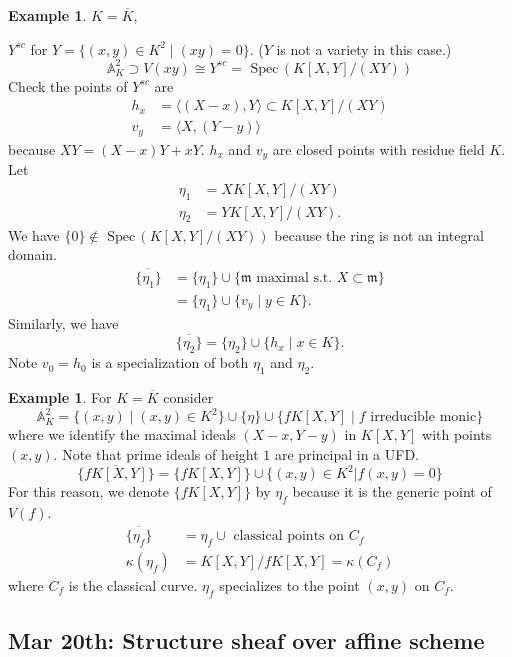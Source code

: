 \documentclass[11pt]{article}
\theoremstyle{definition}
\newtheorem{ex}[thm]{Example}
\newcommand{\spec}{\text{ Spec}\,}
\newcommand{\affn}{\mathbb A}
\newcommand{\scm}{{\mathfrak m}}
\newcommand{\lgl}{\langle}
\newcommand{\rgl}{\rangle}
\begin{document}
\begin{ex}
$K=\overline{K}$, 

$Y^{sc}$ for $Y=\{(x,y)\in K^2 \mid (xy)=0\}$. ($Y$ is not a variety in this case.)
$$
\affn^2_K\supset V(xy)\cong Y^{sc}=\spec(K[X,Y]/(XY))
$$
Check the points of $Y^{sc}$ are
\begin{align*}
h_x & = \lgl (X-x), Y\rgl\subset K[X,Y]/(XY) \\
v_y & =\lgl X, (Y-y)\rgl
\end{align*}
because $XY=(X-x)Y+xY$.
$h_x$ and $v_y$ are closed points with residue field $K$.  Let
\begin{align*}
\eta_1 & =X K[X,Y]/(XY) \\
\eta_2 & =YK[X,Y]/(XY).
\end{align*}
We have $\{0\}\notin \spec (K[X,Y]/(XY))$ because the ring is not an integral domain.
$$
\begin{aligned}
\overline{\{\eta_1\}}&=\{\eta_1\}\cup \{\scm \text{ maximal s.t. } X\subset \scm\}\\
&=\{\eta_1\}\cup \{v_y \mid y\in K\}.
\end{aligned}
$$
Similarly, we have
$$
\overline{\{\eta_2\}}=\{\eta_2\}\cup\{h_x \mid x\in K\}.
$$
Note $v_0=h_0$ is a specialization of both $\eta_1$ and $\eta_2$.
\end{ex}

\begin{ex}
For  $K=\overline{K}$ consider
 $$\affn^2_K=\{(x, y) \mid (x,y)\in K^2\} \cup \{\eta\}\cup \{fK[X,Y] \mid f \text{ irreducible monic}\}$$ 
 where we identify the maximal ideals $(X-x, Y-y)$ in $K[X,Y]$ with points $(x,y)$. 
Note that prime ideals of height $1$ are principal in a UFD.
$$
\overline{\{fK[X,Y]\}}=\{f K[X,Y]\}\cup \{(x,y)\in K^2|f(x,y)=0\}
$$
For this reason, we denote $\{fK[X,Y]\}$ by $\eta_f$ because it is the generic point of $V(f)$.
\begin{align*}
\overline{\{\eta_f\}} & =\eta_f\cup \text{ classical points on } C_f \\
\kappa(\eta_f) & =K[X,Y]/fK[X,Y]=\kappa(C_f) 
\end{align*}
where $C_f$ is the classical curve.
$\eta_f$ specializes to the point $(x,y)$ on $C_f$.

\end{ex}

\subsection{Mar 20th: Structure sheaf over affine scheme}
\end{document}
